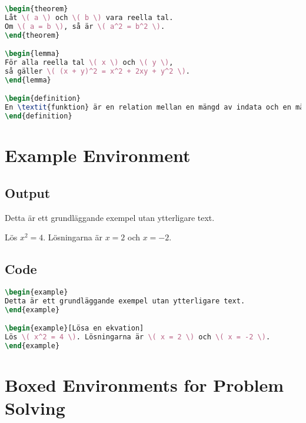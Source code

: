 \documentclass[swedish]{article}
\begin{document}
\begin{lstlisting}[language=TeX]
\begin{theorem}
Låt \( a \) och \( b \) vara reella tal.
Om \( a = b \), så är \( a^2 = b^2 \).
\end{theorem}

\begin{lemma}
För alla reella tal \( x \) och \( y \),
så gäller \( (x + y)^2 = x^2 + 2xy + y^2 \).
\end{lemma}

\begin{definition}
En \textit{funktion} är en relation mellan en mängd av indata och en mängd av möjliga utdata, där varje indata relateras till exakt ett utdata.
\end{definition}
\end{lstlisting}

\section{Example Environment}

\subsection{Output}

\begin{example}
Detta är ett grundläggande exempel utan ytterligare text.
\end{example}

\begin{example}
Lös \( x^2 = 4 \). Lösningarna är \( x = 2 \) och \( x = -2 \).
\end{example}

\subsection{Code}

\begin{lstlisting}[language=TeX]
\begin{example}
Detta är ett grundläggande exempel utan ytterligare text.
\end{example}

\begin{example}[Lösa en ekvation]
Lös \( x^2 = 4 \). Lösningarna är \( x = 2 \) och \( x = -2 \).
\end{example}
\end{lstlisting}

\section{Boxed Environments for Problem Solving}
\end{document}
